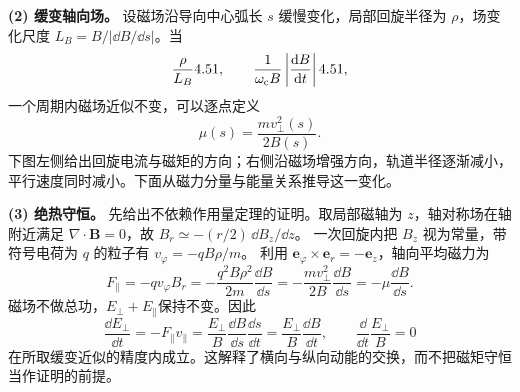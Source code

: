 {\begin{xesolution}
\textbf{(2) 缓变轴向场。}
设磁场沿导向中心弧长 $s$ 缓慢变化，局部回旋半径为 $\rho$，场变化尺度
$L_B=B/|\dd B/\dd s|$。当
\begin{equation}
  \frac{\rho}{L_B}4.51,
  \qquad
  \frac1{\omega_{\rm c}B}\left|\frac{\mathop{}\!\mathrm d B}{\mathop{}\!\mathrm d t}\right|4.51,
\end{equation}
一个周期内磁场近似不变，可以逐点定义
\begin{equation}
  \boxed{\mu(s)=\frac{mv_\perp^2(s)}{2B(s)}}.
\end{equation}
下图左侧给出回旋电流与磁矩的方向；右侧沿磁场增强方向，轨道半径逐渐减小，
平行速度同时减小。下面从磁力分量与能量关系推导这一变化。
\begin{rTwoFigure}
\end{rTwoFigure}

\textbf{(3) 绝热守恒。}
先给出不依赖作用量定理的证明。取局部磁轴为 $z$，轴对称场在轴附近满足
$\nabla\cdot\boldsymbol B=0$，故 $B_r\simeq-(r/2)\,\dd B_z/\dd z$。
一次回旋内把 $B_z$ 视为常量，带符号电荷为 $q$ 的粒子有 $v_\varphi=-qB\rho/m$。
利用 $\boldsymbol e_\varphi\times\boldsymbol e_r=-\boldsymbol e_z$，轴向平均磁力为
\[
 F_\parallel=-qv_\varphi B_r
 =-\frac{q^2B\rho^2}{2m}\frac{\dd B}{\dd s}
 =-\frac{mv_\perp^2}{2B}\frac{\dd B}{\dd s}=-\mu\frac{\dd B}{\dd s}.
\]
磁场不做总功，$E_\perp+E_\parallel$保持不变。因此
\[
 \frac{\dd E_\perp}{\dd t}=-F_\parallel v_\parallel
 =\frac{E_\perp}{B}\frac{\dd B}{\dd s}\frac{\dd s}{\dd t}
 =\frac{E_\perp}{B}\frac{\dd B}{\dd t},\qquad
 \frac{\dd}{\dd t}\frac{E_\perp}{B}=0
\]
在所取缓变近似的精度内成立。这解释了横向与纵向动能的交换，而不把磁矩守恒当作证明的前提。


\end{xesolution}}
